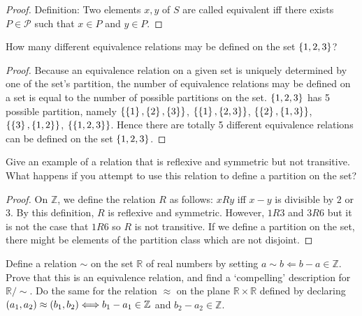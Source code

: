 \begin{proof}
	Definition: Two elements $x, y$ of $S$ are called equivalent iff there exists $P\in \mathscr{P}$ such that $x\in P$ and $y\in P$.
\end{proof}

\begin{exercise}{1.4}
	How many different equivalence relations may be defined on the set $\left\{{1, 2, 3}\right\}$?
\end{exercise}

\begin{proof}
	Because an equivalence relation on a given set is uniquely determined by one of the set's partition, the number of equivalence relations may be defined on a set is equal to the number of possible partitions on the set. $\left\{{1, 2, 3}\right\}$ has 5 possible partition, namely $\left\{{\left\{{1}\right\}, \left\{{2}\right\}, \left\{{3}\right\}}\right\}$, $\left\{{\left\{{1}\right\}, \left\{{2, 3}\right\}}\right\}$, $\left\{{\left\{{2}\right\}, \left\{{1, 3}\right\}}\right\}$, $\left\{{\left\{{3}\right\}, \left\{{1, 2}\right\}}\right\}$, $\left\{{\left\{{1, 2, 3}\right\}}\right\}$. Hence there are totally 5 different equivalence relations can be defined on the set $\left\{{1, 2, 3}\right\}$.
\end{proof}

\begin{exercise}{1.5}
	Give an example of a relation that is reflexive and symmetric but not transitive. What happens if you attempt to use this relation to define a partition on the set?
\end{exercise}

\begin{proof}
	On $\mathbb{Z}$, we define the relation $R$ as follows: $xRy$ iff $x - y$ is divisible by $2$ or $3$. By this definition, $R$ is reflexive and symmetric. However, $1R3$ and $3R6$ but it is not the case that $1R6$ so $R$ is not transitive. If we define a partition on the set, there might be elements of the partition class which are not disjoint.
\end{proof}

\begin{exercise}{1.6}
	Define a relation $\sim$ on the set $\mathbb{R}$ of real numbers by setting $a\sim b \Longleftarrow b - a\in\mathbb{Z}$. Prove that this is an equivalence relation, and find a `compelling' description for $\mathbb{R}/\sim$. Do the same for the relation $\approx$ on the plane $\mathbb{R}\times\mathbb{R}$ defined by declaring $\left({a_{1}, a_{2}}\right) \approx \left({b_{1}, b_{2}}\right) \Longleftrightarrow b_{1} - a_{1} \in \mathbb{Z}$ and $b_{2} - a_{2}\in\mathbb{Z}$.
\end{exercise}

